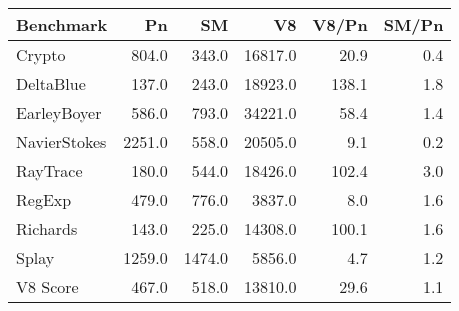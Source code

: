 \begin{tabular}{|l|r|r|r|r|r|}
  \hline
  Benchmark & Pn & SM & V8 & V8/Pn & SM/Pn \\
  \hline \hline
  Crypto & 804.0 & 343.0 & 16817.0 & 20.9 & 0.4\\
  \hline
  DeltaBlue & 137.0 & 243.0 & 18923.0 & 138.1 & 1.8\\
  \hline
  EarleyBoyer & 586.0 & 793.0 & 34221.0 & 58.4 & 1.4\\
  \hline
  NavierStokes & 2251.0 & 558.0 & 20505.0 & 9.1 & 0.2\\
  \hline
  RayTrace & 180.0 & 544.0 & 18426.0 & 102.4 & 3.0\\
  \hline
  RegExp & 479.0 & 776.0 & 3837.0 & 8.0 & 1.6\\
  \hline
  Richards & 143.0 & 225.0 & 14308.0 & 100.1 & 1.6\\
  \hline
  Splay & 1259.0 & 1474.0 & 5856.0 & 4.7 & 1.2\\
  \hline
  \hline
  V8 Score & 467.0 & 518.0 & 13810.0 & 29.6 & 1.1\\
  \hline
\end{tabular}

